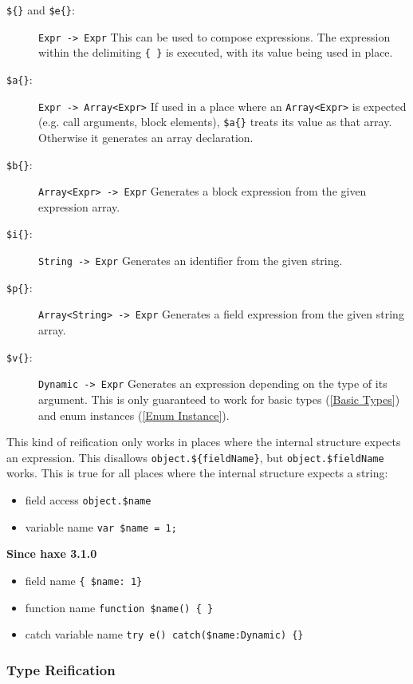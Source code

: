 \documentclass{article}
\newcommand{\type}[1]{\texttt{#1}}
\newcommand{\expr}[1]{\texttt{#1}}
\newcommand{\tref}[2]{#1 (\ref{#2})}
\newcommand{\since}[1]{\noindent\textbf{Since haxe #1}\\}
\begin{document}
\begin{description}
	\item[\expr{\$\{\}} and \expr{\$e\{\}}:] \type{Expr -> Expr} This can be used to compose expressions. The expression within the delimiting \expr{\{ \}} is executed, with its value being used in place.
	\item[\expr{\$a\{\}}:] \type{Expr -> Array<Expr>} If used in a place where an \type{Array<Expr>} is expected (e.g. call arguments, block elements), \expr{\$a\{\}} treats its value as that array. Otherwise it generates an array declaration.
	\item[\expr{\$b\{\}}:] \type{Array<Expr> -> Expr} Generates a block expression from the given expression array.
	\item[\expr{\$i\{\}}:] \type{String -> Expr} Generates an identifier from the given string.
	\item[\expr{\$p\{\}}:] \type{Array<String> -> Expr} Generates a field expression from the given string array.
	\item[\expr{\$v\{\}}:] \type{Dynamic -> Expr} Generates an expression depending on the type of its argument. This is only guaranteed to work for \tref{basic types}{Basic Types} and \tref{enum instances}{Enum Instance}.
\end{description}

This kind of reification only works in places where the internal structure expects an expression. This disallows \expr{object.\$\{fieldName\}}, but \expr{object.\$fieldName} works. This is true for all places where the internal structure expects a string:

\begin{itemize}
	\item field access \expr{object.\$name}
	\item variable name \expr{var \$name = 1;}
\end{itemize}
\since{3.1.0}
\begin{itemize}
	\item field name \expr{\{ \$name: 1\} }
	\item function name \expr{function \$name() \{ \}}
	\item catch variable name \expr{try e() catch(\$name:Dynamic) \{\}}
\end{itemize}


\subsubsection{Type Reification}
\end{document}
